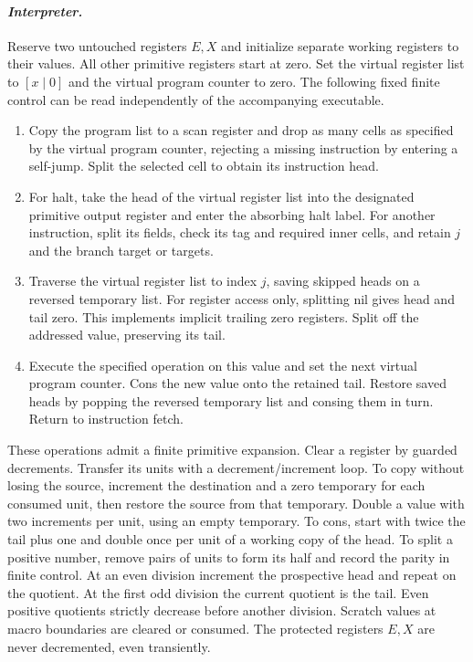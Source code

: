 \paragraph{\textit{Interpreter.}}
Reserve two untouched registers \(E,X\) and initialize separate working registers to their values. All other primitive registers start at zero. Set the virtual register list to \([x\mid0]\) and the virtual program counter to zero. The following fixed finite control can be read independently of the accompanying executable.
\begin{enumerate}
\item Copy the program list to a scan register and drop as many cells as specified by the virtual program counter, rejecting a missing instruction by entering a self-jump. Split the selected cell to obtain its instruction head.
\item For halt, take the head of the virtual register list into the designated primitive output register and enter the absorbing halt label. For another instruction, split its fields, check its tag and required inner cells, and retain \(j\) and the branch target or targets.
\item Traverse the virtual register list to index \(j\), saving skipped heads on a reversed temporary list. For register access only, splitting nil gives head and tail zero. This implements implicit trailing zero registers. Split off the addressed value, preserving its tail.
\item Execute the specified operation on this value and set the next virtual program counter. Cons the new value onto the retained tail. Restore saved heads by popping the reversed temporary list and consing them in turn. Return to instruction fetch.
\end{enumerate}

These operations admit a finite primitive expansion. Clear a register by guarded decrements. Transfer its units with a decrement/increment loop. To copy without losing the source, increment the destination and a zero temporary for each consumed unit, then restore the source from that temporary. Double a value with two increments per unit, using an empty temporary. To cons, start with twice the tail plus one and double once per unit of a working copy of the head. To split a positive number, remove pairs of units to form its half and record the parity in finite control. At an even division increment the prospective head and repeat on the quotient. At the first odd division the current quotient is the tail. Even positive quotients strictly decrease before another division. Scratch values at macro boundaries are cleared or consumed. The protected registers \(E,X\) are never decremented, even transiently.

